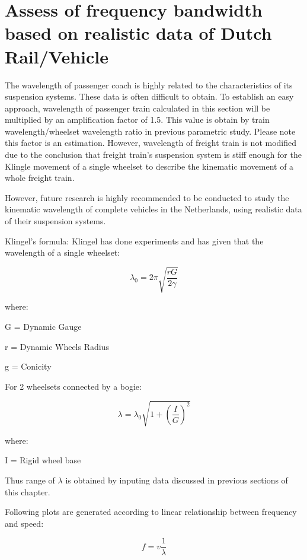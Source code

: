 \section{Assess of frequency bandwidth based on realistic data of Dutch Rail/Vehicle}

The wavelength of passenger coach is highly related to the characteristics of its suspension systems. These data is often difficult to obtain. To establish an easy approach, wavelength of passenger train calculated in this section will be multiplied by an amplification factor of 1.5. This value is obtain by train wavelength/wheelset wavelength ratio in previous parametric study. Please note this factor is an estimation. However, wavelength of freight train is not modified due to the conclusion that freight train's suspension system is stiff enough for the Klingle movement of a single wheelset to describe the kinematic movement of a whole freight train.

However, future research is highly recommended to be conducted to study the kinematic wavelength of complete vehicles in the Netherlands, using realistic data of their suspension systems.

Klingel's formula:
Klingel has done experiments and has given that the wavelength of a single wheelset:

$$ \lambda_0 = 2 \pi \sqrt{\frac{rG}{2\gamma} }$$

where:

G = Dynamic Gauge

r = Dynamic Wheels Radius

g = Conicity

For 2 wheelsets connected by a bogie:

$$ \lambda = \lambda_0 \sqrt{1+(\frac{I}{G})^2}  $$

where:

I = Rigid wheel base

Thus range of $\lambda$ is obtained by inputing data discussed in previous sections of this chapter.

Following plots are generated according to linear relationship between frequency and speed:

$$ f = v \frac{1}{\lambda} $$


\begin{figure}[h!]
\centering
{}
\end{figure}

